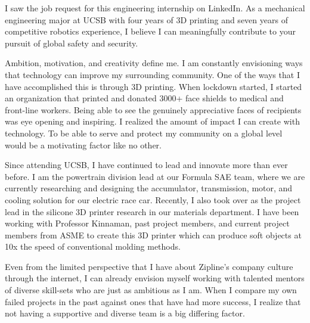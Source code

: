 \documentclass[11pt, letterpaper]{awesome-cv} %
\begin{document}
\makecvheader %

\makelettertitle %


\begin{cvletter}


I saw the job request for this engineering internship on LinkedIn. As a mechanical engineering major at UCSB with four years of 3D printing and seven years of competitive robotics experience, I believe I can meaningfully contribute to your pursuit of global safety and security.


Ambition, motivation, and creativity define me. I am constantly envisioning ways that technology can improve my surrounding community. One of the ways that I have accomplished this is through 3D printing. When lockdown started, I started an organization that printed and donated 3000+ face shields to medical and front-line workers. Being able to see the genuinely appreciative faces of recipients was eye opening and inspiring. I realized the amount of impact I can create with technology. To be able to serve and protect my community on a global level would be a motivating factor like no other.


Since attending UCSB, I have continued to lead and innovate more than ever before. I am the powertrain division lead at our Formula SAE team, where we are currently researching and designing the accumulator, transmission, motor, and cooling solution for our electric race car. Recently, I also took over as the project lead in the silicone 3D printer research in our materials department. I have been working with Professor Kinnaman, past project members, and current project members from ASME to create this 3D printer which can produce soft objects at 10x the speed of conventional molding methods.



Even from the limited perspective that I have about Zipline's company culture through the internet, I can already envision myself working with talented mentors of diverse skill-sets who are just as ambitious as I am. When I compare my own failed projects in the past against ones that have had more success, I realize that not having a supportive and diverse team is a big differing factor. 


\end{cvletter}
\end{document}
